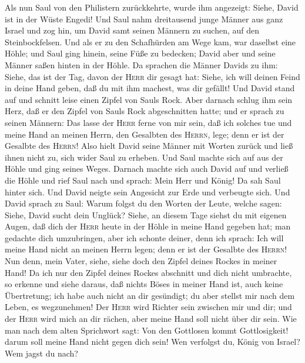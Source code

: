  Als nun Saul von den Philistern zurückkehrte, wurde ihm
angezeigt:  Siehe, David ist in der Wüste Engedi! Und Saul
nahm dreitausend junge Männer aus ganz Israel und zog hin, um David samt
seinen Männern zu suchen, auf den Steinbockfelsen.  Und
als er zu den Schafhürden am Wege kam, war daselbst eine Höhle; und Saul
ging hinein, seine Füße zu bedecken; David aber und seine Männer saßen
hinten in der Höhle.  Da sprachen die Männer Davids zu
ihm: Siehe, das ist der Tag, davon der \textsc{Herr} dir gesagt hat:
Siehe, ich will deinen Feind in deine Hand geben, daß du mit ihm
machest, was dir gefällt! Und David stand auf und schnitt leise einen
Zipfel von Sauls Rock.  Aber darnach schlug ihm sein Herz,
daß er den Zipfel von Sauls Rock abgeschnitten hatte;  und
er sprach zu seinen Männern: Das lasse der \textsc{Herr} ferne von mir
sein, daß ich solches tue und meine Hand an meinen Herrn, den Gesalbten
des \textsc{Herrn}, lege; denn er ist der Gesalbte des \textsc{Herrn}!
 Also hielt David seine Männer mit Worten zurück und ließ
ihnen nicht zu, sich wider Saul zu erheben. Und Saul machte sich auf aus
der Höhle und ging seines Weges.  Darnach machte sich auch
David auf und verließ die Höhle und rief Saul nach und sprach: Mein Herr
und König! Da sah Saul hinter sich. Und David neigte sein Angesicht zur
Erde und verbeugte sich.  Und David sprach zu Saul: Warum
folgst du den Worten der Leute, welche sagen: Siehe, David sucht dein
Unglück?  Siehe, an diesem Tage siehst du mit eigenen
Augen, daß dich der \textsc{Herr} heute in der Höhle in meine Hand
gegeben hat; man gedachte dich umzubringen, aber ich schonte deiner,
denn ich sprach: Ich will meine Hand nicht an meinen Herrn legen; denn
er ist der Gesalbte des \textsc{Herrn}!  Nun denn, mein
Vater, siehe, siehe doch den Zipfel deines Rockes in meiner Hand! Da ich
nur den Zipfel deines Rockes abschnitt und dich nicht umbrachte, so
erkenne und siehe daraus, daß nichts Böses in meiner Hand ist, auch
keine Übertretung; ich habe auch nicht an dir gesündigt; du aber stellst
mir nach dem Leben, es wegzunehmen!  Der \textsc{Herr}
wird Richter sein zwischen mir und dir; und der \textsc{Herr} wird mich
an dir rächen, aber meine Hand soll nicht über dir sein. 
Wie man nach dem alten Sprichwort sagt: Von den Gottlosen kommt
Gottlosigkeit! darum soll meine Hand nicht gegen dich sein!
 Wen verfolgst du, König von Israel? Wem jagst du nach?
